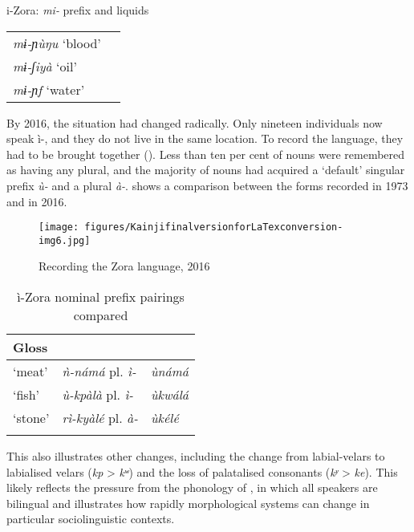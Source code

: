 \documentclass[output=paper]{langsci/langscibook}
\begin{document}
 \ea\label{ex:kainji:3}
 {i-Zora: \textit{mi-} prefix and liquids}\\
\begin{tabular}{ll}
	\textit{mɨ-ɲùŋu} ‘blood’\\
	\textit{mɨ-ʃiyà} ‘oil’\\
	\textit{mɨ-ɲf} ‘water’\\
\end{tabular}
\z

By 2016, the situation had changed radically. Only nineteen individuals now speak ì-, and they do not live in the same location. To record the language, they had to be brought together (). Less than ten per cent of nouns were remembered as having any plural, and the majority of nouns had acquired a ‘default’ singular prefix \textit{ù-} and a plural \textit{à-}.  shows a comparison between the forms recorded in 1973 and in 2016.

\begin{figure}[t]
\texttt{[image: figures/KainjifinalversionforLaTexconversion-img6.jpg]}
 \caption{\label{fig:kainji:9} Recording the Zora language, 2016}
\end{figure}


\begin{table}
\caption{\label{tab:kainji:18}ì-Zora nominal prefix pairings compared}
\begin{tabularx}{\textwidth}{XXX}
\lsptoprule
{Gloss}	& {\citet{Shimizu1979}}	& {\citet{Blench2016}}\\
\midrule
`meat'	& \textit{ǹ-námá} pl. \textit{ì-}	& \textit{ùnámá}\\
`fish'	& \textit{ù-kpàlà} pl. \textit{ì-}	& \textit{ùkwálá}\\
`stone'	& \textit{rì-kyàlé} pl. \textit{à-}	& \textit{ùkélé}\\
\lspbottomrule
\end{tabularx}
\end{table}


\largerpage
This also illustrates other changes, including the change from labial-velars to labialised velars (\textit{kp} > \textit{kʷ}) and the loss of palatalised consonants (\textit{kʸ} > \textit{ke}). This likely reflects the pressure from the phonology of , in which all speakers are bilingual and illustrates how rapidly morphological systems can change in particular sociolinguistic contexts.
\end{document}
